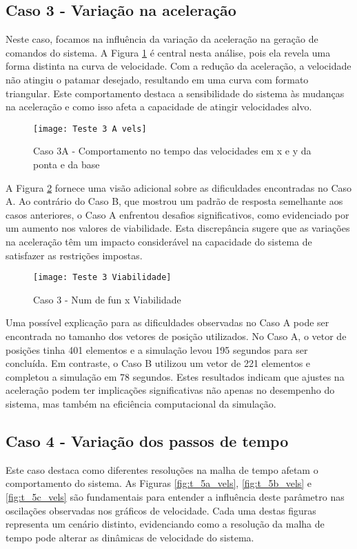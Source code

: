 \subsection{Caso 3 - Variação na aceleração}
Neste caso, focamos na influência da variação da aceleração na geração de comandos do sistema. A Figura \ref{fig:t_3a_vels} é central nesta análise, pois ela revela uma forma distinta na curva de velocidade. Com a redução da aceleração, a velocidade não atingiu o patamar desejado, resultando em uma curva com formato triangular. Este comportamento destaca a sensibilidade do sistema às mudanças na aceleração e como isso afeta a capacidade de atingir velocidades alvo.

\begin{figure}[H]
    \begin{center}
    \caption{Caso 3A - Comportamento no tempo das velocidades em x e y da ponta e da base}
    \texttt{[image: Teste 3 A vels]}
    \label{fig:t_3a_vels}
    \end{center}
\end{figure}

A Figura \ref{fig:t_3_viab} fornece uma visão adicional sobre as dificuldades encontradas no Caso A. Ao contrário do Caso B, que mostrou um padrão de resposta semelhante aos casos anteriores, o Caso A enfrentou desafios significativos, como evidenciado por um aumento nos valores de viabilidade. Esta discrepância sugere que as variações na aceleração têm um impacto considerável na capacidade do sistema de satisfazer as restrições impostas.

\begin{figure}[H]
    \begin{center}
    \caption{Caso 3 - Num de fun x Viabilidade}
    \texttt{[image: Teste 3 Viabilidade]}
    \label{fig:t_3_viab}
    \end{center}
\end{figure}

Uma possível explicação para as dificuldades observadas no Caso A pode ser encontrada no tamanho dos vetores de posição utilizados. No Caso A, o vetor de posições tinha 401 elementos e a simulação levou 195 segundos para ser concluída. Em contraste, o Caso B utilizou um vetor de 221 elementos e completou a simulação em 78 segundos. Estes resultados indicam que ajustes na aceleração podem ter implicações significativas não apenas no desempenho do sistema, mas também na eficiência computacional da simulação.

\subsection{Caso 4 - Variação dos passos de tempo}
Este caso destaca como diferentes resoluções na malha de tempo afetam o comportamento do sistema. As Figuras \ref{fig:t_5a_vels}, \ref{fig:t_5b_vels} e \ref{fig:t_5c_vels} são fundamentais para entender a influência deste parâmetro nas oscilações observadas nos gráficos de velocidade. Cada uma destas figuras representa um cenário distinto, evidenciando como a resolução da malha de tempo pode alterar as dinâmicas de velocidade do sistema.

